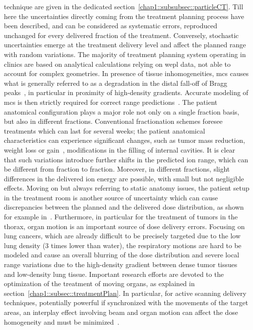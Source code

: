 technique are given in the dedicated section~\ref{chap1::subsubsec::particleCT}.
Till here the uncertainties directly coming from the treatment planning process have been described, and can be considered as systematic errors, reproduced unchanged for every delivered fraction of the treatment. Conversely, stochastic uncertainties emerge at the treatment delivery level and affect the planned range with random variations. The majority of treatment planning system operating in clinics are based on analytical calculations relying on \gls{wepl} data, not able to account for complex geometries. In presence of tissue inhomogeneities, \gls{mcs} causes what is generally referred to as a degradation in the distal fall-off of Bragg peaks~\parencite{Urie1986}, in particular in proximity of high-density gradients.  Accurate modeling of \gls{mcs} is then strictly required for correct range predictions~\parencite{Schuemann2014}. The patient anatomical configuration plays a major role not only on a single fraction basis, but also in different fractions. Conventional fractionation schemes foresee treatments which can last for several weeks; the patient anatomical characteristics can experience significant changes, such as tumor mass reduction, weight loss or gain~\parencite{Albertini2008}, modifications in the filling of internal cavities. It is clear that such variations introduce further shifts in the predicted ion range, which can be different from fraction to fraction. Moreover, in different fractions, slight differences in the delivered ion energy are possible, with small but not negligible effects. 
Moving on but always referring to static anatomy issues, the patient setup in the treatment room is another source of uncertainty which can cause discrepancies between the planned and the delivered dose distribution, as shown for example in~\cite{Fattori2014}. 
Furthermore, in particular for the treatment of tumors in the thorax, organ motion  is an important source of dose delivery errors. Focusing on lung cancers, which are already difficult to be precisely targeted due to the low lung density (3 times lower than water), the respiratory motions are hard to be modeled and cause an overall blurring of the dose distribution and severe local range variations due to the high-density gradient between dense tumor tissues and low-density lung tissue. Important research efforts are devoted to the optimization of the treatment of moving organs, as explained in section~\ref{chap1::subsec::treatmentPlan}. In particular, for active scanning delivery techniques, potentially powerful if synchronized with the movements of the target areas, an interplay effect involving beam and organ motion can affect the dose homogeneity and must be minimized~\parencite{Dowdell2013, Grassberger2015}.
